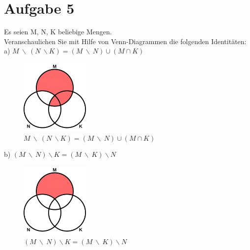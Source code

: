 \section*{Aufgabe 5}

Es seien M, N, K beliebige Mengen.\\
Veranschaulichen Sie mit Hilfe von Venn-Diagrammen die folgenden Identitäten:\\

a) $M \ \backslash \ (N \ \backslash K) = (M \ \backslash \ N) \cup (M \cap K)$

\begin{figure}[h]
\begin{center}
\includegraphics[width=0.3\textwidth]{graphics/venn1.png}
\caption{$M \ \backslash \ (N \ \backslash K) = (M \ \backslash \ N) \cup (M \cap K)$}
\end{center}
\end{figure}

b) $(M \ \backslash \ N) \backslash K = (M \ \backslash \ K) \backslash N$

\begin{figure}[h]
\begin{center}
\includegraphics[width=0.3\textwidth]{graphics/venn2.png}
\caption{$(M \ \backslash \ N) \backslash K = (M \ \backslash \ K) \backslash N$}
\end{center}
\end{figure}

\newpage